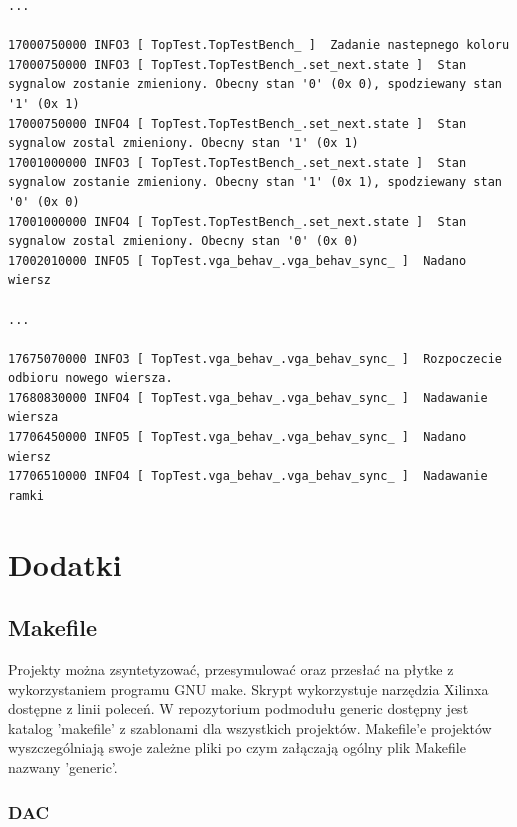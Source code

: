\documentclass[a4paper,12pt]{article}
\begin{document}
\begin{lstlisting}[label=Vga_output,caption=Vga logs output]
...

17000750000 INFO3 [ TopTest.TopTestBench_ ]  Zadanie nastepnego koloru
17000750000 INFO3 [ TopTest.TopTestBench_.set_next.state ]  Stan sygnalow zostanie zmieniony. Obecny stan '0' (0x 0), spodziewany stan '1' (0x 1)
17000750000 INFO4 [ TopTest.TopTestBench_.set_next.state ]  Stan sygnalow zostal zmieniony. Obecny stan '1' (0x 1)
17001000000 INFO3 [ TopTest.TopTestBench_.set_next.state ]  Stan sygnalow zostanie zmieniony. Obecny stan '1' (0x 1), spodziewany stan '0' (0x 0)
17001000000 INFO4 [ TopTest.TopTestBench_.set_next.state ]  Stan sygnalow zostal zmieniony. Obecny stan '0' (0x 0)
17002010000 INFO5 [ TopTest.vga_behav_.vga_behav_sync_ ]  Nadano  wiersz

...

17675070000 INFO3 [ TopTest.vga_behav_.vga_behav_sync_ ]  Rozpoczecie odbioru nowego wiersza.
17680830000 INFO4 [ TopTest.vga_behav_.vga_behav_sync_ ]  Nadawanie wiersza
17706450000 INFO5 [ TopTest.vga_behav_.vga_behav_sync_ ]  Nadano  wiersz
17706510000 INFO4 [ TopTest.vga_behav_.vga_behav_sync_ ]  Nadawanie ramki
\end{lstlisting}



\section{Dodatki}

\subsection{Makefile}

Projekty można zsyntetyzować, przesymulować oraz przesłać na płytke z wykorzystaniem programu GNU make. Skrypt wykorzystuje narzędzia Xilinxa dostępne z linii poleceń. W repozytorium podmodułu generic dostępny jest katalog 'makefile' z szablonami dla wszystkich projektów. Makefile'e projektów wyszczególniają swoje zależne pliki po czym załączają ogólny plik Makefile nazwany 'generic'.






\subsubsection{DAC}

\end{document}
